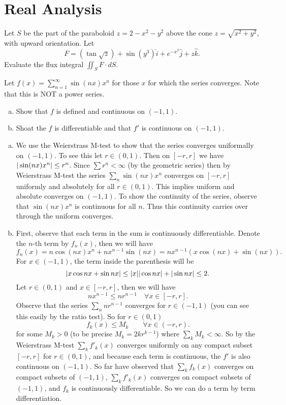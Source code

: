\section{Real Analysis}
\begin{problem}
	Let $ S $ be the part of the paraboloid $ z = 2 - x^2 - y^2 $ above the cone $ z = \sqrt{x^2+y^2} $, with upward orientation. Let
	\[ F = (\tan\sqrt{z}) + \sin(y^3) \hat{i} + e^{-x^2} \hat{j} + z \hat{k}. \]
	Evaluate the flux integral $ \iint_S F\cdot dS.\ $
\end{problem}


\begin{problem}
	Let $ f(x) = \sum_{n=1}^{\infty}\sin(nx)x^n$ for those $ x $ for which the series converges. Note that this is NOT a power series. 
	\begin{enumerate}[(a)]
		\item Show that $ f $ is defined and continuous on $ (-1,1) $.
		\item Shoat the $ f $ is differentiable and that $ f' $ is continuous on $ (-1,1) $.
	\end{enumerate}
\end{problem}
\begin{solution}
	\begin{enumerate}[(a)]
		\item We use the Weierstrass M-test to show that the series converges uniformally on $ (-1,1) $. To see this let $ r \in (0,1) $. Then on $ [-r,r] $ we have $ |\sin(nx)x^n| \leq r^n $. Since $ \sum r^n < \infty $ (by the geometric series) then by Weierstrass M-test the series $ \sum_n \sin(nx)x^n $ converges on $ [-r,r] $ uniformly and absolutely for all $ r\in (0,1) $. This implies uniform and absolute converges on $ (-1,1) $. To show the continuity of the series, observe that $ \sin(nx)x^n $ is continuous for all $ n $. Thus this continuity carries over through the uniform converges. 
		
		\item First, observe that each term in the sum is continuously differentiable. Denote the $ n $-th term by $ f_n(x) $, then we will have
		\[ f_n(x) = n\cos(nx)x^n + nx^{n-1}\sin(nx) = nx^{n-1} (x\cos(nx) + \sin(nx)). \]
		For $ x \in (-1,1) $, the term inside the parenthesis will be
		\[ |x\cos nx + \sin nx| \leq |x||\cos nx| + |\sin nx| \leq 2. \]
		Let $ r \in (0,1) $ and $ x \in [-r,r] $, then we will have 
		\[ nx^{n-1} \leq nr^{n-1} \quad \forall x \in [-r,r]. \]
		Observe that the series $\sum_n nr^{n-1} $ converges for $ r\in (-1,1) $ (you can see this easily by the ratio test). So for $ r\in (0,1) $
		\[ f_k(x) \leq M_k  \qquad \forall x\in (-r,r). \]
		for some $ M_k > 0 $ (to be precise $ M_k = 2kr^{k-1} $) where $ \sum_k M_k < \infty $. So by the Weierstrass M-test $ \sum_k f'_k(x) $ converges uniformly on any compact subset $ [-r,r] $ for $ r\in (0,1) $, and because each term is continuous, the $ f' $ is also continuous on $ (-1,1) $. So far have observed that $ \sum_k f_k(x) $ converges on compact subsets of $ (-1,1) $, $ \sum_k f'_k(x) $ converges on compact subsets of $ (-1,1) $, and $ f_k $ is continuously differentiable. So we can do a term by term differentiation. 
	\end{enumerate}
\end{solution}
